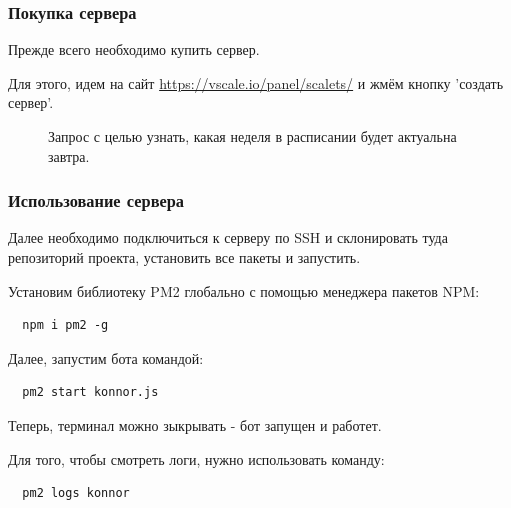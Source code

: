 \documentclass[bachelor, och, coursework, times]{SCWorks}
\begin{document}
\subsubsection {Покупка сервера}
Прежде всего необходимо купить сервер.

Для этого, идем на сайт \href{https://vscale.io/panel/scalets/}{https://vscale.io/panel/scalets/} и 
жмём кнопку 'создать сервер'. 
\begin{figure}[h]
  \caption{Запрос с целью узнать, какая неделя в расписании будет актуальна завтра.}
  \label{ris:pair}
  \end{figure}


\subsubsection {Использование сервера}
Далее необходимо подключиться к серверу по SSH и
склонировать туда репозиторий проекта, установить все пакеты и запустить.


Установим библиотеку PM2  глобально с помощью менеджера пакетов NPM:

\begin{lstlisting}
  npm i pm2 -g
\end{lstlisting}

Далее, запустим бота командой: 

\begin{lstlisting}
  pm2 start konnor.js
\end{lstlisting}

Теперь, терминал можно зыкрывать - бот запущен и работет.


Для того, чтобы смотреть логи, нужно использовать команду:

\begin{lstlisting}
  pm2 logs konnor
\end{lstlisting}
\end{document}
